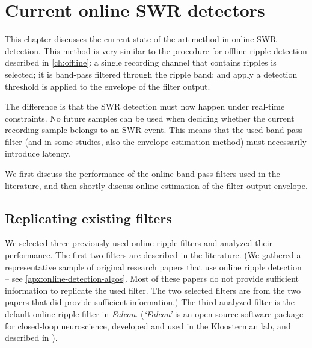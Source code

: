 \chapter{Current online SWR detectors}
\label{ch:BPF}

This chapter discusses the current state-of-the-art method in online SWR detection. This method is very similar to the procedure for offline ripple detection described in \cref{ch:offline}: a single recording channel that contains ripples is selected; it is band-pass filtered through the ripple band; and apply a detection threshold is applied to the envelope of the filter output.

The difference is that the SWR detection must now happen under real-time constraints. No future samples can be used when deciding whether the current recording sample belongs to an SWR event. This means that the used band-pass filter (and in some studies, also the envelope estimation method) must necessarily introduce latency.

We first discuss the performance of the online band-pass filters used in the literature, and then shortly discuss online estimation of the filter output envelope.




\section{Replicating existing filters}

We selected three previously used online ripple filters and analyzed their performance. The first two filters are described in the literature. (We gathered a representative sample of original research papers that use online ripple detection -- see \cref{apx:online-detection-algos}. Most of these papers do not provide sufficient information to replicate the used filter. The two selected filters are from the two papers that did provide sufficient information.)
The third analyzed filter is the default online ripple filter in \emph{Falcon}. (\emph{`Falcon'} is an open-source software package for closed-loop neuroscience, developed and used in the Kloosterman lab, and described in ).

